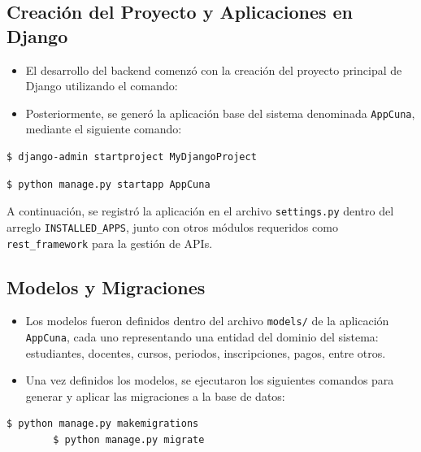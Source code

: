 \documentclass{article}
\begin{document}
    \subsection{Creación del Proyecto y Aplicaciones en Django}
        \begin{itemize}
            \item El desarrollo del backend comenzó con la creación del proyecto principal de Django utilizando el comando:
            \item Posteriormente, se generó la aplicación base del sistema denominada \texttt{AppCuna}, mediante el siguiente comando:
        \end{itemize}
        \begin{lstlisting}[language=bash, caption={Creación del Proyecto Django}, numbers=none]
        $ django-admin startproject MyDjangoProject
        \end{lstlisting}
        \begin{lstlisting}[language=bash, caption={Creación de la aplicación AppCuna}, numbers=none]
        $ python manage.py startapp AppCuna
        \end{lstlisting}

        A continuación, se registró la aplicación en el archivo \texttt{settings.py} dentro del arreglo \texttt{INSTALLED\_APPS}, junto con otros módulos requeridos como \texttt{rest\_framework} para la gestión de APIs.
    \subsection{Modelos y Migraciones}
    \begin{itemize}
        \item Los modelos fueron definidos dentro del archivo \texttt{models/} de la aplicación \texttt{AppCuna}, cada uno representando una entidad del dominio del sistema: estudiantes, docentes, cursos, periodos, inscripciones, pagos, entre otros.
        \item Una vez definidos los modelos, se ejecutaron los siguientes comandos para generar y aplicar las migraciones a la base de datos:

    \end{itemize}


\begin{lstlisting}[language=bash, caption={Migraciones de los modelos}, numbers=none]
        $ python manage.py makemigrations
        $ python manage.py migrate
\end{lstlisting}
\end{document}
